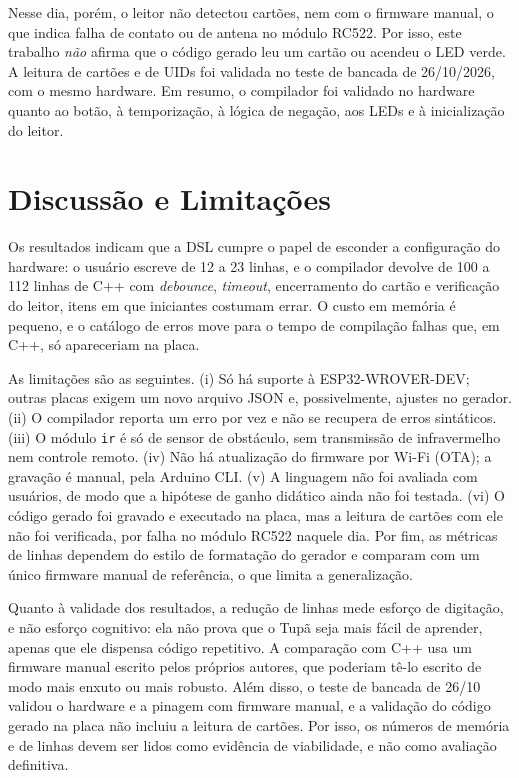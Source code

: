 \documentclass[conference]{IEEEtran}
\begin{document}
Nesse dia, porém, o leitor não detectou cartões, nem com o firmware manual, o
que indica falha de contato ou de antena no módulo RC522. Por isso, este
trabalho \emph{não} afirma que o código gerado leu um cartão ou acendeu o LED
verde. A leitura de cartões e de UIDs foi validada no teste de bancada de
26/10/2026, com o mesmo hardware. Em resumo, o compilador foi validado no
hardware quanto ao botão, à temporização, à lógica de negação, aos LEDs e à
inicialização do leitor.

\section{Discussão e Limitações}\label{sec:discussao}
Os resultados indicam que a DSL cumpre o papel de esconder a configuração do
hardware: o usuário escreve de 12 a 23 linhas, e o compilador devolve de 100 a
112 linhas de C++ com \textit{debounce}, \textit{timeout}, encerramento do
cartão e verificação do leitor, itens em que iniciantes costumam errar. O
custo em memória é pequeno, e o catálogo de erros move para o tempo de
compilação falhas que, em C++, só apareceriam na placa.

As limitações são as seguintes. (i) Só há suporte à ESP32-WROVER-DEV; outras
placas exigem um novo arquivo JSON e, possivelmente, ajustes no gerador. (ii)
O compilador reporta um erro por vez e não se recupera de erros sintáticos.
(iii) O módulo \texttt{ir} é só de sensor de obstáculo, sem transmissão de
infravermelho nem controle remoto. (iv) Não há atualização do firmware por
Wi-Fi (OTA); a gravação é manual, pela Arduino CLI. (v) A linguagem não foi
avaliada com usuários, de modo que a hipótese de ganho didático ainda não foi
testada. (vi) O código gerado foi gravado e executado na placa, mas a leitura de
cartões com ele não foi verificada, por falha no módulo RC522 naquele dia. Por fim, as
métricas de linhas dependem do estilo de formatação do gerador e comparam com
um único firmware manual de referência, o que limita a generalização.

Quanto à validade dos resultados, a redução de linhas mede esforço de
digitação, e não esforço cognitivo: ela não prova que o Tupã seja mais fácil de
aprender, apenas que ele dispensa código repetitivo. A comparação com C++ usa
um firmware manual escrito pelos próprios autores, que poderiam tê-lo escrito
de modo mais enxuto ou mais robusto. Além disso, o teste de bancada de 26/10 validou o
hardware e a pinagem com firmware manual, e a validação do código gerado na
placa não incluiu a leitura de cartões. Por isso, os números de memória e
de linhas devem ser lidos como evidência de viabilidade, e não como avaliação
definitiva.
\end{document}
